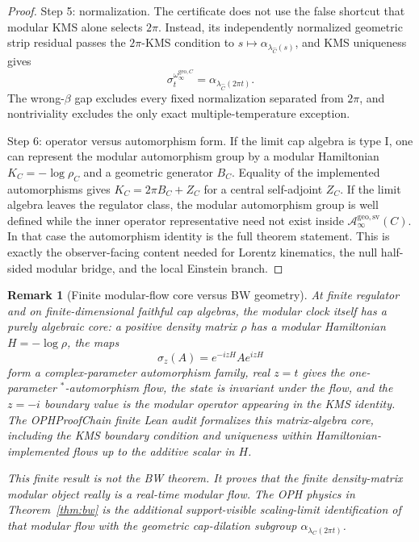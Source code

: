 \documentclass[11pt]{article}
\newtheorem{remark}[theorem]{Remark}
\begin{document}
\begin{proof}
Step 5: normalization. The certificate does not use the false shortcut that modular KMS alone
selects \(2\pi\). Instead, its independently normalized geometric strip residual passes the
\(2\pi\)-KMS condition to \(s\mapsto\alpha_{\lambda_{\widehat C}(s)}\), and KMS uniqueness gives
\[
\sigma_t^{\omega_\infty^{\mathrm{geo},C}}
=
\alpha_{\lambda_{\widehat C}(2\pi t)}.
\]
The wrong-\(\beta\) gap excludes every fixed normalization separated from \(2\pi\), and
nontriviality excludes the only exact multiple-temperature exception.

Step 6: operator versus automorphism form. If the limit cap algebra is type I, one can represent the modular automorphism group by a modular Hamiltonian \(K_C=-\log\rho_C\) and a geometric generator \(B_C\). Equality of the implemented automorphisms gives \(K_C=2\pi B_C+Z_C\) for a central self-adjoint \(Z_C\). If the limit algebra leaves the regulator class, the modular automorphism group is well defined while the inner operator representative need not exist inside \(\mathcal A_\infty^{\mathrm{geo,sv}}(C)\). In that case the automorphism identity is the full theorem statement. This is exactly the observer-facing content needed for Lorentz kinematics, the null half-sided modular bridge, and the local Einstein branch.
\end{proof}

\begin{remark}[Finite modular-flow core versus BW geometry]\label{rem:finite-modular-flow-core}
At finite regulator and on finite-dimensional faithful cap algebras, the
modular clock itself has a purely algebraic core: a positive density matrix
\(\rho\) has a modular Hamiltonian \(H=-\log\rho\), the maps
\[
\sigma_z(A)=e^{-izH}Ae^{izH}
\]
form a complex-parameter automorphism family, real \(z=t\) gives the
one-parameter \(^*\)-automorphism flow, the state is invariant under the flow,
and the \(z=-i\) boundary value is the modular operator appearing in the KMS
identity.  The OPHProofChain finite Lean audit formalizes this
matrix-algebra core, including
the KMS boundary condition and uniqueness within Hamiltonian-implemented flows
up to the additive scalar in \(H\).

This finite result is not the BW theorem.  It proves that the finite
density-matrix modular object really is a real-time modular flow.  The OPH
physics in Theorem~\ref{thm:bw} is the additional support-visible scaling-limit
identification of that modular flow with the geometric cap-dilation subgroup
\(\alpha_{\lambda_C(2\pi t)}\).
\end{remark}
\end{document}

